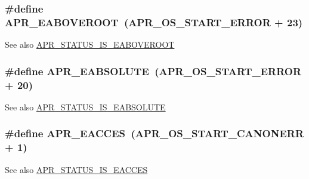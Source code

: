 \subsubsection[{\texorpdfstring{A\+P\+R\+\_\+\+E\+A\+B\+O\+V\+E\+R\+O\+OT}{APR_EABOVEROOT}}]{\setlength{\rightskip}{0pt plus 5cm}\#define A\+P\+R\+\_\+\+E\+A\+B\+O\+V\+E\+R\+O\+OT~({\bf A\+P\+R\+\_\+\+O\+S\+\_\+\+S\+T\+A\+R\+T\+\_\+\+E\+R\+R\+OR} + 23)}\hypertarget{group___a_p_r___error_ga4828cc04f97dc7bed691456adf7c073e}{}\label{group___a_p_r___error_ga4828cc04f97dc7bed691456adf7c073e}
\begin{DoxySeeAlso}{See also}
\hyperlink{group___a_p_r___s_t_a_t_u_s___i_s_ga641527647de2537c1946a0b2ef07e411}{A\+P\+R\+\_\+\+S\+T\+A\+T\+U\+S\+\_\+\+I\+S\+\_\+\+E\+A\+B\+O\+V\+E\+R\+O\+OT} 
\end{DoxySeeAlso}
\subsubsection[{\texorpdfstring{A\+P\+R\+\_\+\+E\+A\+B\+S\+O\+L\+U\+TE}{APR_EABSOLUTE}}]{\setlength{\rightskip}{0pt plus 5cm}\#define A\+P\+R\+\_\+\+E\+A\+B\+S\+O\+L\+U\+TE~({\bf A\+P\+R\+\_\+\+O\+S\+\_\+\+S\+T\+A\+R\+T\+\_\+\+E\+R\+R\+OR} + 20)}\hypertarget{group___a_p_r___error_gafd1ffc5bf2bf215ad048780408913d0e}{}\label{group___a_p_r___error_gafd1ffc5bf2bf215ad048780408913d0e}
\begin{DoxySeeAlso}{See also}
\hyperlink{group___a_p_r___s_t_a_t_u_s___i_s_ga6c0f8edb3a9a73037e8d07aa4fade52f}{A\+P\+R\+\_\+\+S\+T\+A\+T\+U\+S\+\_\+\+I\+S\+\_\+\+E\+A\+B\+S\+O\+L\+U\+TE} 
\end{DoxySeeAlso}
\subsubsection[{\texorpdfstring{A\+P\+R\+\_\+\+E\+A\+C\+C\+ES}{APR_EACCES}}]{\setlength{\rightskip}{0pt plus 5cm}\#define A\+P\+R\+\_\+\+E\+A\+C\+C\+ES~({\bf A\+P\+R\+\_\+\+O\+S\+\_\+\+S\+T\+A\+R\+T\+\_\+\+C\+A\+N\+O\+N\+E\+RR} + 1)}\hypertarget{group___a_p_r___error_ga407fc0ea7ead60f7a97fb9d70061bd41}{}\label{group___a_p_r___error_ga407fc0ea7ead60f7a97fb9d70061bd41}
\begin{DoxySeeAlso}{See also}
\hyperlink{group___a_p_r___s_t_a_t_u_s___i_s_gabd43d80532579a4a5763d3c9cb196a06}{A\+P\+R\+\_\+\+S\+T\+A\+T\+U\+S\+\_\+\+I\+S\+\_\+\+E\+A\+C\+C\+ES} 
\end{DoxySeeAlso}
